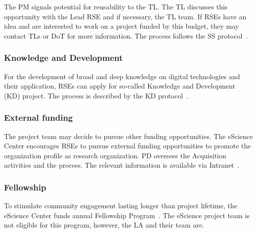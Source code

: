 The PM signals potential for reusability to the TL. The TL discusses this opportunity with the Lead RSE and if
necessary, the TL team. If RSEs have an idea and are interested to work on a project funded by this budget, they may
contact TLs or DoT for more information. The process follows the SS protocol~\cite{ss-intranet}.

\subsubsection{Knowledge and Development}
\label{sec:opportunities:kd}
For the development of broad and deep knowledge on digital technologies and their application, RSEs can apply for
so-called Knowledge and Development (KD) project. The process is described by the KD protocol~\cite{kd-intranet}.

\subsubsection{External funding}
\label{sec:opportunities:external-funding}
The project team may decide to pursue other funding opportunities. The eScience Center encourages RSEs to pursue
external funding opportunities to promote the organization profile as research organization. PD oversees the
Acquisition activities and the process. The relevant information is available via Intranet~\cite{external-intranet}.


\subsubsection{Fellowship}
\label{sec:opportunities:fellowship}
To stimulate community engagement lasting longer than project lifetime, the eScience Center funds annual Fellowship
Program~\cite{fellowship-intranet}. The eScience project team is not eligible for this program, however, the LA and their team are.